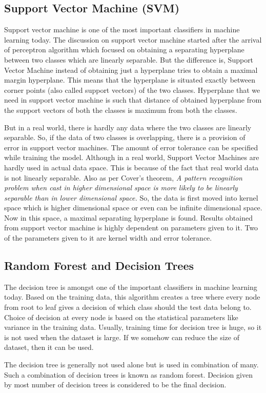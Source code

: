\subsection{Support Vector Machine (SVM)}
Support vector machine is one of the most important classifiers in machine learning today. The discussion on support vector machine started after the arrival of perceptron algorithm which focused on obtaining a separating hyperplane between two classes which are linearly separable. But the difference is, Support Vector Machine instead of obtaining just a hyperplane tries to obtain a maximal margin hyperplane. This means that the hyperplane is situated exactly between corner points (also called support vectors) of the two classes. Hyperplane that we need in support vector machine is such that distance of obtained hyperplane from the support vectors of both the classes is maximum from both the classes.  \par
But in a real world, there is hardly any data where the two classes are linearly separable. So, if the data of two classes is overlapping, there is a provision of error in support vector machines. The amount of error tolerance can be specified while training the model. Although in a real world, Support Vector Machines are hardly used in actual data space. This is because of the fact that real world data is not linearly separable. Also as per Cover's theorem, \textit{A pattern recognition problem when cast in higher dimensional space is more likely to be linearly separable than in lower dimensional space.} So, the data is first moved into kernel space which is higher dimensional space or even can be infinite dimensional space. Now in this space, a maximal separating hyperplane is found. Results obtained from support vector machine is highly dependent on parameters given to it. Two of the parameters given to it are kernel width and error tolerance.

\subsection{Random Forest and Decision Trees}
The decision tree is amongst one of the important classifiers in machine learning today. Based on the training data, this algorithm creates a tree where every node from root to leaf gives a decision of which class should the test data belong to. Choice of decision at every node is based on the statistical parameters like variance in the training data. Usually, training time for decision tree is huge, so it is not used when the dataset is large. If we somehow can reduce the size of dataset, then it can be used. \par 
The decision tree is generally not used alone but is used in combination of many. Such a combination of decision trees is known as random forest. Decision given by most number of decision trees is considered to be the final decision.
